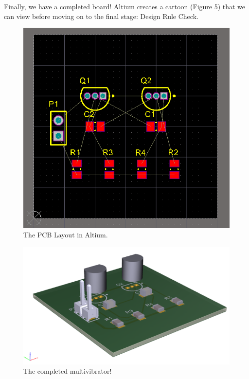 \documentclass[12pt]{article}
\begin{document}
\noindent
Finally, we have a completed board! Altium creates a cartoon (Figure 5) that we can view before moving on to the final stage: Design Rule Check.

\begin{figure}[h]
    \begin{center}
    \includegraphics[scale=0.4]{Figures/Altium_pcb1.PNG}
    \caption{The PCB Layout in Altium.}
    \end{center}
    \end{figure}
    
    \begin{figure}[h]
    \begin{center}
    \includegraphics[scale=0.6]{Figures/Altium_pcb2.PNG}
    \caption{The completed multivibrator!}
    \end{center}
    \end{figure}
\end{document}
